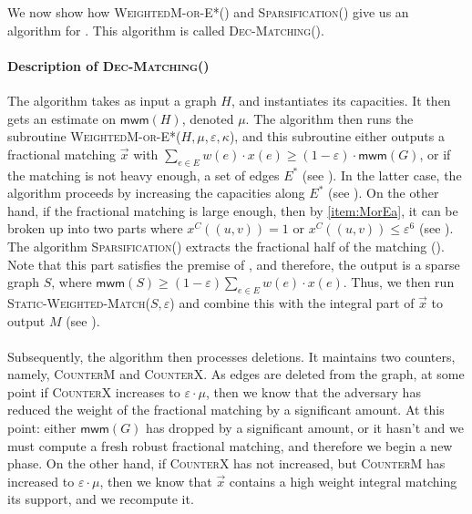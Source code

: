 \documentclass[a4paper,11pt]{article}
\newcommand{\eps}{\varepsilon}
\theoremstyle{definition}
\theoremstyle{definition}
\theoremstyle{definition}
\theoremstyle{definition}
\theoremstyle{definition}
\theoremstyle{definition}
\theoremstyle{definition}
\theoremstyle{definition}
\theoremstyle{definition}
\theoremstyle{definition}
\theoremstyle{definition}
\theoremstyle{definition}
\theoremstyle{definition}
\theoremstyle{definition}
\theoremstyle{definition}
\begin{document}
We now show how \textsc{WeightedM-or-E*}() and \textsc{Sparsification}() give us an algorithm for . This algorithm is called \textsc{Dec-Matching}(). 

\paragraph{Description of \textsc{Dec-Matching}()}
The algorithm takes as input a graph $H$, and instantiates its capacities. It then gets an estimate on $\textsf{mwm}(H)$, denoted $\mu$. The algorithm then runs the subroutine \textsc{WeightedM-or-E*}($H,\mu, \eps,\kappa$), and this subroutine either outputs a fractional matching $\vec{x}$ with $\sum_{e\in E}w(e)\cdot x(e)\geqslant (1-\eps)\cdot \textsf{mwm}(G)$, or if the matching is not heavy enough, a set of edges $E^*$ (see ). In the latter case, the algorithm proceeds by increasing the capacities along $E^*$ (see ). On the other hand, if the fractional matching is large enough, then by \ref{item:MorEa}, it can be broken up into two parts where $x^C((u,v))=1$ or $x^C((u,v))\leqslant \eps^6$ (see ). The algorithm \textsc{Sparsification}() extracts the fractional half of the matching (). Note that this part satisfies the premise of , and therefore, the output is a sparse graph $S$, where $\textsf{mwm}(S)\geqslant (1-\eps)\sum_{e\in E} w(e)\cdot x(e)$. Thus, we then run \textsc{Static-Weighted-Match}($S,\eps$) and combine this with the integral part of $\vec{x}$ to output $M$ (see ). \\ \\
Subsequently, the algorithm then processes deletions. It maintains two counters, namely, \textsc{CounterM} and \textsc{CounterX}. As edges are deleted from the graph, at some point if \textsc{CounterX} increases to $\eps\cdot \mu$, then we know that the adversary has reduced the weight of the fractional matching by a significant amount. At this point: either $\textsf{mwm}(G)$ has dropped by a significant amount, or it hasn't and we must compute a fresh robust fractional matching, and therefore we begin a new phase. On the other hand, if \textsc{CounterX} has not increased, but \textsc{CounterM} has increased to $\eps\cdot \mu$, then we know that $\vec{x}$ contains a high weight integral matching its support, and we recompute it.
\end{document}
